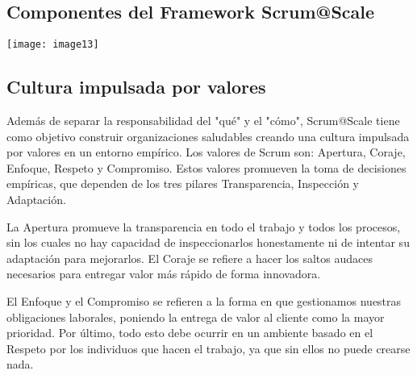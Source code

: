 \documentclass{article} %
\begin{document}
\noindent 
\subsection{}

\noindent 
\subsection{Componentes del Framework Scrum@Scale{\circledR}}

\noindent \textbf{\underbar{}}

\noindent \texttt{[image: image13]}

\noindent 
\subsection{}

\noindent 
\subsection{Cultura impulsada por valores}

\noindent 

\noindent Adem\'{a}s de separar la responsabilidad del "qu\'{e}" y el "c\'{o}mo", Scrum@Scale tiene como objetivo construir organizaciones saludables creando una cultura impulsada por valores en un entorno emp\'{i}rico. Los valores de Scrum son: Apertura, Coraje, Enfoque, Respeto y Compromiso. Estos valores promueven la toma de decisiones emp\'{i}ricas, que dependen de los tres pilares Transparencia, Inspecci\'{o}n y Adaptaci\'{o}n.

\noindent 

\noindent La Apertura promueve la transparencia en todo el trabajo y todos los procesos, sin los cuales no hay capacidad de inspeccionarlos honestamente ni de intentar su adaptaci\'{o}n para mejorarlos. El Coraje se refiere a hacer los saltos audaces necesarios para entregar valor m\'{a}s r\'{a}pido de forma innovadora.

\noindent 

\noindent El Enfoque y el Compromiso se refieren a la forma en que gestionamos nuestras obligaciones laborales, poniendo la entrega de valor al cliente como la mayor prioridad. Por \'{u}ltimo, todo esto debe ocurrir en un ambiente basado en el Respeto por los individuos que hacen el trabajo, ya que sin ellos no puede crearse nada.

\noindent 
\end{document}
